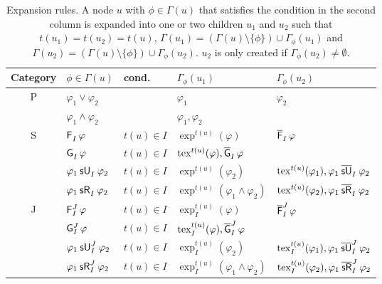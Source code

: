\documentclass[acmsmall,screen]{acmart}
\begin{document}
\begin{table}
\caption{Expansion rules.
A node $u$ with $\phi \in \Gamma(u)$ that satisfies the condition in the second column
is expanded into one or two children $u_1$ and $u_2$ such that
$t(u_1) = t(u_2) = t(u)$, $\Gamma(u_1) = (\Gamma(u) \setminus \{\phi\}) \cup \Gamma_\phi(u_1)$
and $\Gamma(u_2) = (\Gamma(u) \setminus \{\phi\}) \cup \Gamma_\phi(u_2)$.
$u_2$ is only created if $\Gamma_\phi(u_2) \neq \emptyset$.}
\label{tab:expansion-rules}
\centering
\begin{tabular}{c l l l l}
\toprule
Category & $\phi \in \Gamma(u)$ & cond. & $\Gamma_\phi(u_1)$ & $\Gamma_\phi(u_2)$ \\
\midrule
\multirow{2}{*}{P}
& $\varphi_1 \lor \varphi_2$ & & $\varphi_1$ & $\varphi_2$  \\
& $\varphi_1 \land \varphi_2$ & & $\varphi_1, \varphi_2$ & \\
\midrule
\multirow{4}{*}{S}
&  $\even{I} \varphi$ &  $t(u) \in I$ &  $\exp^{t(u)}(\varphi)$ &  $\meven{I} \varphi$ \\
& $\glob{I} \varphi$ & $t(u) \in I$ &  $\exp^{t(u)}(\varphi), \mglob{I} \varphi$ \\
& $\suntil{I}{\varphi_1}{\varphi_2}$ &  $t(u) \in I$ & $\exp^{t(u)}(\varphi_2)$ &  $\exp^{t(u)}(\varphi_1), \msuntil{I}{\varphi_1}{\varphi_2}$ \\
& $\srelease{I}{\varphi_1}{\varphi_2}$ &  $t(u) \in I$ &  $\exp^{t(u)}(\varphi_1 \land \varphi_2)$ &  $\exp^{t(u)}(\varphi_2), \msrelease{I}{\varphi_1}{\varphi_2}$ \\
\midrule
\multirow{5}{*}{J}
& $\even[J]{I} \varphi$ & $t(u) \in I$ &  $\exp^{t(u)}_I(\varphi)$ &  $\meven[J]{I} \varphi$ \\
&  $\glob[J]{I} \varphi$ & $t(u) \in I$ &  $\exp^{t(u)}_I(\varphi), \mglob[J]{I} \varphi$ \\
& $\suntil[J]{I}{\varphi_1}{\varphi_2}$ & $t(u) \in I$ & $\exp^{t(u)}_I(\varphi_2)$ & $\exp^{t(u)}_I(\varphi_1), \msuntil[J]{I}{\varphi_1}{\varphi_2}$ \\
& $\srelease[J]{I}{\varphi_1}{\varphi_2}$ & $t(u) \in I$ & $\exp^{t(u)}_I(\varphi_1 \land \varphi_2)$ & $\exp^{t(u)}_I(\varphi_2), \msrelease[J]{I}{\varphi_1}{\varphi_2}$ \\
\bottomrule
\end{tabular}
\end{table}
\end{document}
